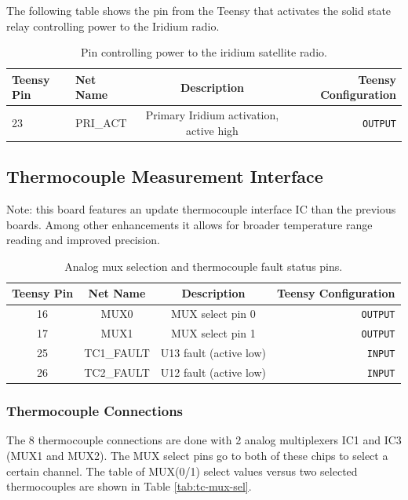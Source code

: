 \documentclass{article}
\begin{document}
The following table shows the pin from the Teensy that activates the solid state relay controlling power to the Iridium radio.
\begin{table}[H]
    \centering
    \begin{tabular}{l|l|c|r}
   Teensy Pin & Net Name     &  Description  & Teensy Configuration \\
    \hline
    23 & PRI\_ACT   & Primary Iridium activation, active high & \texttt{OUTPUT} 
    \end{tabular}
    \caption{Pin controlling power to the iridium satellite radio.}
    \label{tab:pins-iridium}
\end{table}

\subsection{Thermocouple Measurement Interface}
Note: this board features an update thermocouple interface IC than the previous boards. Among other enhancements it allows for broader temperature range reading and improved precision.
\begin{table}[H]
    \centering
    \begin{tabular}{c|c|c|r}
    Teensy Pin & Net Name  & Description   & Teensy Configuration \\
    \hline 
    16 & MUX0 & MUX select pin 0 & \texttt{OUTPUT} \\
    17 & MUX1 & MUX select pin 1 & \texttt{OUTPUT} \\
    25 & TC1\_FAULT & U13 fault (active low) & \texttt{INPUT} \\
    26 & TC2\_FAULT & U12 fault (active low) & \texttt{INPUT} \\ 
    \end{tabular}
    \caption{Analog mux selection and thermocouple fault status pins.}
    \label{tab:pins_thermo}
\end{table}

\subsubsection{Thermocouple Connections}
The 8 thermocouple connections are done with 2 analog multiplexers IC1 and IC3 (MUX1 and MUX2). The MUX select pins go to both of these chips to select a certain channel. The table of MUX(0/1) select values versus two selected thermocouples are shown in Table \ref{tab:tc-mux-sel}.
\end{document}
